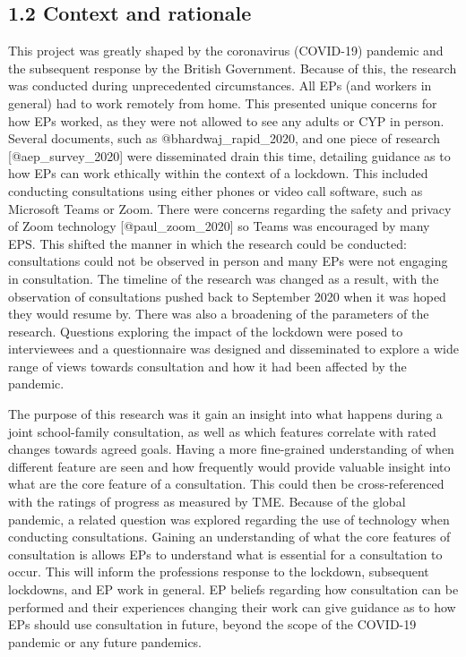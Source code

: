 \documentclass[
]{article}
\begin{document}
\hypertarget{context-and-rationale}{%
\subsection{1.2 Context and rationale}\label{context-and-rationale}}

This project was greatly shaped by the coronavirus (COVID-19) pandemic
and the subsequent response by the British Government. Because of this,
the research was conducted during unprecedented circumstances. All EPs
(and workers in general) had to work remotely from home. This presented
unique concerns for how EPs worked, as they were not allowed to see any
adults or CYP in person. Several documents, such as
@bhardwaj\_rapid\_2020, and one piece of research
{[}@aep\_survey\_2020{]} were disseminated drain this time, detailing
guidance as to how EPs can work ethically within the context of a
lockdown. This included conducting consultations using either phones or
video call software, such as Microsoft Teams or Zoom. There were
concerns regarding the safety and privacy of Zoom technology
{[}@paul\_zoom\_2020{]} so Teams was encouraged by many EPS. This
shifted the manner in which the research could be conducted:
consultations could not be observed in person and many EPs were not
engaging in consultation. The timeline of the research was changed as a
result, with the observation of consultations pushed back to September
2020 when it was hoped they would resume by. There was also a broadening
of the parameters of the research. Questions exploring the impact of the
lockdown were posed to interviewees and a questionnaire was designed and
disseminated to explore a wide range of views towards consultation and
how it had been affected by the pandemic.

The purpose of this research was it gain an insight into what happens
during a joint school-family consultation, as well as which features
correlate with rated changes towards agreed goals. Having a more
fine-grained understanding of when different feature are seen and how
frequently would provide valuable insight into what are the core feature
of a consultation. This could then be cross-referenced with the ratings
of progress as measured by TME. Because of the global pandemic, a
related question was explored regarding the use of technology when
conducting consultations. Gaining an understanding of what the core
features of consultation is allows EPs to understand what is essential
for a consultation to occur. This will inform the professions response
to the lockdown, subsequent lockdowns, and EP work in general. EP
beliefs regarding how consultation can be performed and their
experiences changing their work can give guidance as to how EPs should
use consultation in future, beyond the scope of the COVID-19 pandemic or
any future pandemics.
\end{document}
